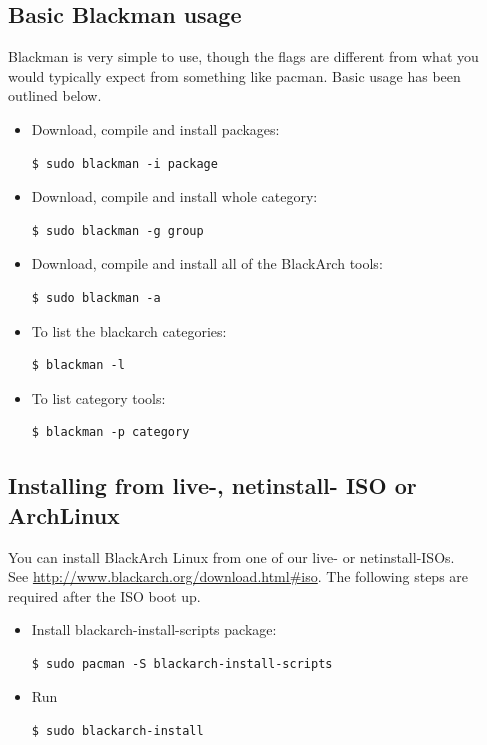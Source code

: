 \documentclass[a4paper, oneside, 11pt]{book}
\begin{document}
\subsection{Basic Blackman usage} Blackman is very simple to use, though the flags are different from what you
would typically expect from something like pacman. Basic usage has been outlined below.
\begin{itemize}
\item Download, compile and install packages:
{\small
\color{gray}
\begin{verbatim}
$ sudo blackman -i package
\end{verbatim}
}
\item Download, compile and install whole category:
{\small
\color{gray}
\begin{verbatim}
$ sudo blackman -g group
\end{verbatim}
}
\item Download, compile and install all of the BlackArch tools:
{\small
\color{gray}
\begin{verbatim}
$ sudo blackman -a
\end{verbatim}
}
\item To list the blackarch categories:
{\small
\color{gray}
\begin{verbatim}
$ blackman -l
\end{verbatim}
}
\item To list category tools:
{\small
\color{gray}
\begin{verbatim}
$ blackman -p category
\end{verbatim}
}
\end{itemize}

\subsection{Installing from live-, netinstall- ISO or ArchLinux}
You can install BlackArch Linux from one of our live- or netinstall-ISOs.\\See
\url{http://www.blackarch.org/download.html#iso}. The following steps are
required after the ISO boot up.
\begin{itemize}
\item Install blackarch-install-scripts package:
{\small
\color{gray}
\begin{verbatim}
$ sudo pacman -S blackarch-install-scripts
\end{verbatim}
}
\item Run
{\small
\color{gray}
\begin{verbatim}
$ sudo blackarch-install
\end{verbatim}
}
\end{itemize}
\end{document}
